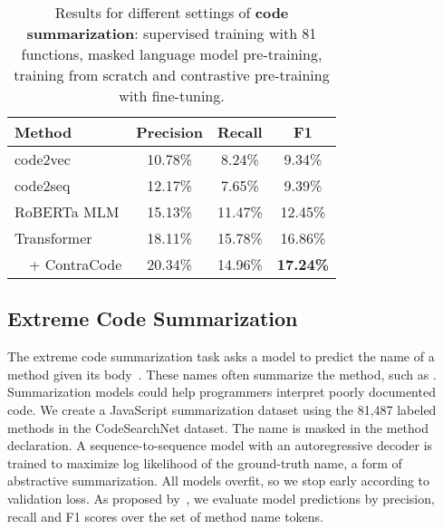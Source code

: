 \documentclass[11pt]{article}
\newcommand{\thou}[0]{}
\newcommand{\ours}[0]{ContraCode}
\begin{document}
\begin{table}
\centering
\setlength\tabcolsep{4.2pt}
\centering
\begin{tabular}{lccc} \hline
    \textbf{Method} & \textbf{Precision} & \textbf{Recall} & \textbf{F1} \\
    \hline
    code2vec & 10.78\% & 8.24\% & 9.34\% \\
    code2seq & 12.17\% & 7.65\% & 9.39\% \\
    RoBERTa MLM & 15.13\% & 11.47\% & 12.45\% \\
    Transformer & 18.11\% & 15.78\% & 16.86\% \\
    \rowcolor{Gray}
    ~~+ \ours{} & 20.34\% & 14.96\% & \textbf{17.24\%}  \\  \hline
\end{tabular}
\caption{Results for different settings of \textbf{code summarization}: supervised training with 81\thou{} functions, masked language model pre-training, training from scratch and contrastive pre-training with fine-tuning.}
\label{tab:summarization}
\end{table} 
\subsection{Extreme Code Summarization}
\label{sec:experiments_code_summarization}
The extreme code summarization task asks a model to predict the name of a method given its body~\citep{allamanis2016convolutional}. These names often summarize the method, such as . Summarization models could help programmers interpret poorly documented code. We create a JavaScript summarization dataset using the 81,487 labeled methods in the CodeSearchNet dataset. The name is masked in the method declaration. A sequence-to-sequence model with an autoregressive decoder is trained to maximize log likelihood of the ground-truth name, a form of abstractive summarization. All models overfit, so we stop early according to validation loss. As proposed by~\citet{allamanis2016convolutional}, we evaluate model predictions by precision, recall and F1 scores over the set of method name tokens.
\end{document}
